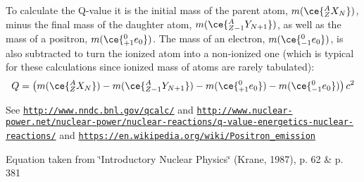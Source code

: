 To calculate the Q-\/value it is the initial mass of the parent atom, $m(\ce{ ^{A}_{Z}X_{N} })$, minus the final mass of the daughter atom, $m(\ce{ ^{A}_{Z -1}Y_{N +1} })$, as well as the mass of a positron, $m(\ce{ ^{0}_{+1}e_{0} })$. The mass of an electron, $m(\ce{ ^{0}_{-1}e_{0} })$, is also subtracted to turn the ionized atom into a non-\/ionized one (which is typical for these calculations since ionized mass of atoms are rarely tabulated)\+: \[Q = \left ( m(\ce{ ^{A}_{Z}X_{N} })-m(\ce{ ^{A}_{Z -1}Y_{N +1} })-m(\ce{ ^{0}_{+1}e_{0} }) - m(\ce{ ^{0}_{-1}e_{0} }) \right) c^2\]

See \href{http://www.nndc.bnl.gov/qcalc/}{\tt http\+://www.\+nndc.\+bnl.\+gov/qcalc/} and \href{http://www.nuclear-power.net/nuclear-power/nuclear-reactions/q-value-energetics-nuclear-reactions/}{\tt http\+://www.\+nuclear-\/power.\+net/nuclear-\/power/nuclear-\/reactions/q-\/value-\/energetics-\/nuclear-\/reactions/} and \href{https://en.wikipedia.org/wiki/Positron_emission}{\tt https\+://en.\+wikipedia.\+org/wiki/\+Positron\+\_\+emission}

Equation taken from \char`\"{}\+Introductory Nuclear Physics\char`\"{} (Krane, 1987), p. 62 \& p. 381


